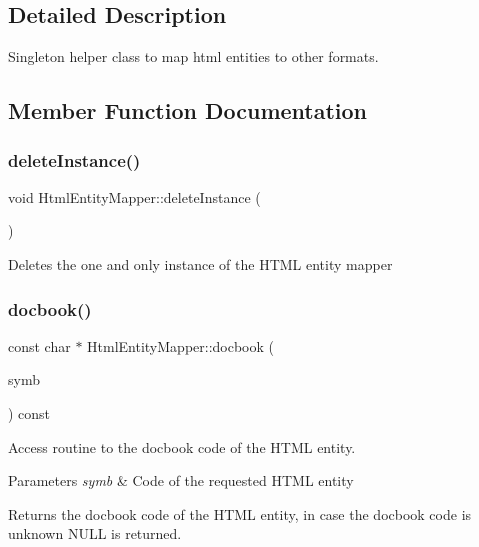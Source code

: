 \subsection{Detailed Description}
Singleton helper class to map html entities to other formats. 

\subsection{Member Function Documentation}
\mbox{\label{class_html_entity_mapper_aa45124007f692528edfa91ffbcb21f12}} 
\subsubsection{\texorpdfstring{deleteInstance()}{deleteInstance()}}
{\footnotesize\ttfamily void Html\+Entity\+Mapper\+::delete\+Instance (\begin{DoxyParamCaption}{ }\end{DoxyParamCaption})\hspace{0.3cm}{\ttfamily [static]}}

Deletes the one and only instance of the H\+T\+ML entity mapper \mbox{\label{class_html_entity_mapper_aa6d9fa38da68c64008be2a971953c5ca}} 
\subsubsection{\texorpdfstring{docbook()}{docbook()}}
{\footnotesize\ttfamily const char $\ast$ Html\+Entity\+Mapper\+::docbook (\begin{DoxyParamCaption}\item[{Doc\+Symbol\+::\+Sym\+Type}]{symb }\end{DoxyParamCaption}) const}



Access routine to the docbook code of the H\+T\+ML entity. 


\begin{DoxyParams}{Parameters}
{\em symb} & Code of the requested H\+T\+ML entity \\
\hline
\end{DoxyParams}
\begin{DoxyReturn}{Returns}
the docbook code of the H\+T\+ML entity, in case the docbook code is unknown {\ttfamily N\+U\+LL} is returned. 
\end{DoxyReturn}
\mbox{\label{class_html_entity_mapper_a6a779e8427a7ad17c5ff767d7e8c34b6}} 
